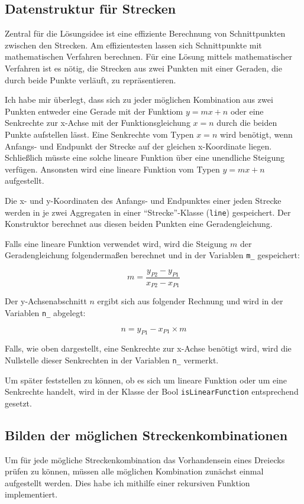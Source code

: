 \subsection {Datenstruktur für Strecken}
Zentral für die Lösungsidee ist eine effiziente Berechnung von Schnittpunkten zwischen den Strecken.
Am effizientesten lassen sich Schnittpunkte mit mathematischen Verfahren berechnen.
Für eine Lösung mittels mathematischer Verfahren ist es nötig, die Strecken aus zwei Punkten mit einer Geraden, die durch beide Punkte verläuft, zu repräsentieren.

Ich habe mir überlegt, dass sich zu jeder möglichen Kombination aus zwei Punkten entweder eine Gerade mit der Funktiom \(y=mx+n\) oder eine Senkrechte zur x-Achse mit der Funktionsgleichung \(x=n\) durch die beiden Punkte aufstellen lässt.
Eine Senkrechte vom Typen \(x=n\) wird benötigt, wenn Anfangs- und Endpunkt der Strecke auf der gleichen x-Koordinate liegen. Schließlich müsste eine solche lineare Funktion über eine unendliche Steigung verfügen.
Ansonsten wird eine lineare Funktion vom Typen \(y=mx+n\) aufgestellt.

Die x- und y-Koordinaten des Anfangs- und Endpunktes einer jeden Strecke werden in je zwei Aggregaten in einer "`Strecke"'-Klasse (\texttt{line}) gespeichert.
Der Konstruktor berechnet aus diesen beiden Punkten eine Geradengleichung.

Falls eine lineare Funktion verwendet wird, wird die Steigung \(m\) der Geradengleichung folgendermaßen berechnet und in der Variablen \texttt{m\_} gespeichert:

\begin{equation}
    m=\frac{y_{P2} - y_{P1}}{x_{P2} - x_{P1}}
\end{equation}

Der y-Achsenabschnitt \(n\) ergibt sich aus folgender Rechnung und wird in der Variablen \texttt{n\_} abgelegt:

\begin{equation}
    n=y_{P1} - x_{P1} \times m
\end{equation}

Falls, wie oben dargestellt, eine Senkrechte zur x-Achse benötigt wird, wird die Nullstelle dieser Senkrechten in der Variablen \texttt{n\_} vermerkt.

Um später feststellen zu können, ob es sich um lineare Funktion oder um eine Senkrechte handelt, wird in der Klasse der Bool \texttt{isLinearFunction} entsprechend gesetzt.

\subsection {Bilden der möglichen Streckenkombinationen}
Um für jede mögliche Streckenkombination das Vorhandensein eines Dreiecks prüfen zu können, müssen alle möglichen Kombination zunächst einmal aufgestellt werden. Dies habe ich mithilfe einer rekursiven Funktion implementiert.

